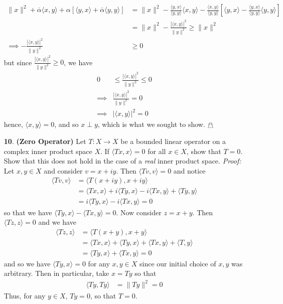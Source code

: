 \documentclass{article}
\newcommand{\inp}[2]{\langle #1, #2 \rangle}
\begin{document}
\begin{itemize}
\begin{align*}
        \|x\|^2 + \overline{\alpha}\inp{x}{y} + \alpha [\inp{y}{x} + \overline{\alpha}\inp{y}{y}] &= \|x\|^2 - \frac{\inp{y}{x}}{\inp{y}{y}}\inp{x}{y} - \frac{\inp{x}{y}}{\inp{y}{y}}\left[\inp{y}{x} - \frac{\inp{y}{x}}{\inp{y}{y}}\inp{y}{y}\right]\\
        &= \|x\|^2 - \frac{|\inp{x}{y}|^2}{\|y\|^2} \geq \|x\|^2\\
        \implies -\frac{|\inp{x}{y}|^2}{\|y\|^2} &\geq 0
    \end{align*}
    but since $\frac{|\inp{x}{y}|^2}{\|y\|^2} \geq 0$, we have
    \begin{align*}
        0 &\leq \frac{|\inp{x}{y}|^2}{\|y\|^2} \leq 0\\
        \implies &\frac{|\inp{x}{y}|^2}{\|y\|^2} = 0\\
        \implies &|\inp{x}{y}|^2 = 0
    \end{align*}
    hence, $\inp{x}{y} = 0$, and so $x \perp y$, which is what we sought to show. \hfill $\mathghost$
    
    \item[\textbf{10}.] \textbf{(Zero Operator)} Let $T: X \to X$ be a bounded linear operator on a complex inner product space $X$. If $\langle Tx, x\rangle = 0$ for all $x \in X$, show that $T = 0$.
        Show that this does not hold in the case of a \textit{real} inner product space. 
    \newline\newline
    \textit{Proof:} Let $x,y \in X$ and consider $v = x + iy$. Then $\inp{Tv}{v} = 0$ and notice
    \begin{align*}
        \inp{Tv}{v} &= \inp{T(x + iy)}{x + iy}\\
        &= \inp{Tx}{x} + i\inp{Ty}{x} - i\inp{Tx}{y} + \inp{Ty}{y}\\
        &= i\inp{Ty}{x} - i\inp{Tx}{y} = 0
    \end{align*}
    so that we have $\inp{Ty}{x} - \inp{Tx}{y} = 0$. Now consider $z = x + y$. Then $\inp{Tz}{z} = 0$ and we have
    \begin{align*}
        \inp{Tz}{z} &= \inp{T(x + y)}{x + y}\\
        &= \inp{Tx}{x} + \inp{Ty}{x} + \inp{Tx}{y} + \inp{T}{y}\\
        &= \inp{Ty}{x} + \inp{Tx}{y} = 0
    \end{align*}
    and so we have $\inp{Ty}{x} = 0$ for any $x,y \in X$ since our initial choice of $x,y$ was arbitrary. Then in particular, take $x = Ty$ so that 
    \begin{align*}
        \inp{Ty}{Ty} &= \|Ty\|^2 = 0 
    \end{align*}
    Thus, for any $y \in X$, $Ty = 0$, so that $T = 0$.
    \newline\newline


\end{itemize}
\end{document}
